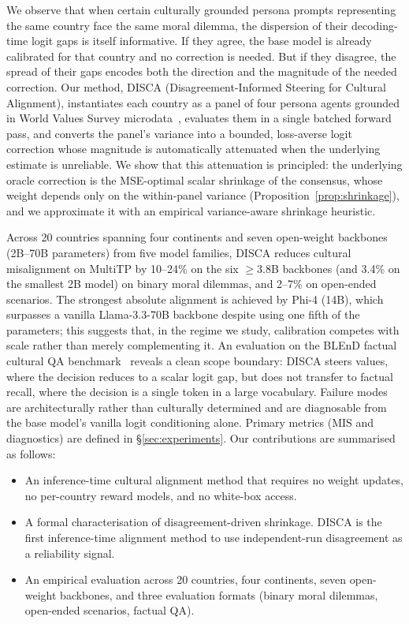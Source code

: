 \documentclass{article}
\begin{document}
We observe that when certain culturally grounded persona prompts representing the same country face the same moral dilemma, the dispersion of their decoding-time logit gaps is itself informative. If they agree, the base model is already calibrated for that country and no correction is needed. But if they disagree, the spread of their gaps encodes both the direction and the magnitude of the needed correction. Our method, DISCA (Disagreement-Informed Steering for Cultural Alignment), instantiates each country as a panel of four persona agents grounded in World Values Survey microdata~\citep{haerpfer2022wvs}, evaluates them in a single batched forward pass, and converts the panel's variance into a bounded, loss-averse logit correction whose magnitude is automatically attenuated when the underlying estimate is unreliable. We show that this attenuation is principled: the underlying oracle correction is the MSE-optimal scalar shrinkage of the consensus, whose weight depends only on the within-panel variance (Proposition~\ref{prop:shrinkage}), and we approximate it with an empirical variance-aware shrinkage heuristic.

Across 20 countries spanning four continents and seven open-weight backbones (2B--70B parameters) from five model families, DISCA reduces cultural misalignment on MultiTP by 10--24\% on the six $\geq$3.8B backbones (and 3.4\% on the smallest 2B model) on binary moral dilemmas, and 2--7\% on open-ended scenarios. The strongest absolute alignment is achieved by Phi-4 (14B), which surpasses a vanilla Llama-3.3-70B backbone despite using one fifth of the parameters; this suggests that, in the regime we study, calibration competes with scale rather than merely complementing it. An evaluation on the BLEnD factual cultural QA benchmark~\citep{myung2024blend} reveals a clean scope boundary: DISCA steers values, where the decision reduces to a scalar logit gap, but does not transfer to factual recall, where the decision is a single token in a large vocabulary. Failure modes are architecturally rather than culturally determined and are diagnosable from the base model's vanilla logit conditioning alone. Primary metrics (MIS and diagnostics) are defined in \S\ref{sec:experiments}.
Our contributions are summarised as follows:
\vspace{-0.1cm}
\begin{itemize}
    \item An inference-time cultural alignment method that requires no weight updates, no per-country reward models, and no white-box access.
    \item A formal characterisation of disagreement-driven shrinkage. DISCA is the first inference-time alignment method to use independent-run disagreement as a reliability signal.
    \item An empirical evaluation across 20 countries, four continents, seven open-weight backbones, and three evaluation formats (binary moral dilemmas, open-ended scenarios, factual QA).
\end{itemize}
\end{document}
